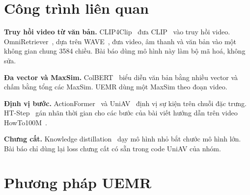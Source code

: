 \documentclass{IEEEtran}
\begin{document}
\section{Công trình liên quan}
\textbf{Truy hồi video từ văn bản.} CLIP4Clip~\cite{clip4clip} đưa CLIP~\cite{clip} vào truy hồi video. OmniRetriever~\cite{omniretriever}, dựa trên WAVE~\cite{wave}, đưa video, âm thanh và văn bản vào một không gian chung 3584 chiều. Bài báo dùng mô hình này làm bộ mã hoá, không sửa.

\textbf{Đa vector và MaxSim.} ColBERT~\cite{colbert} biểu diễn văn bản bằng nhiều vector và chấm bằng tổng các MaxSim. UEMR dùng một MaxSim theo đoạn video.

\textbf{Định vị bước.} ActionFormer~\cite{actionformer} và UniAV~\cite{uniav} định vị sự kiện trên chuỗi đặc trưng. HT-Step~\cite{htstep} gán nhãn thời gian cho các bước của bài viết hướng dẫn trên video HowTo100M~\cite{howto100m}.

\textbf{Chưng cất.} Knowledge distillation~\cite{kd} dạy mô hình nhỏ bắt chước mô hình lớn. Bài báo chỉ dùng lại loss chưng cất có sẵn trong code UniAV của nhóm.

\section{Phương pháp UEMR}
\label{sec:method}
\end{document}
